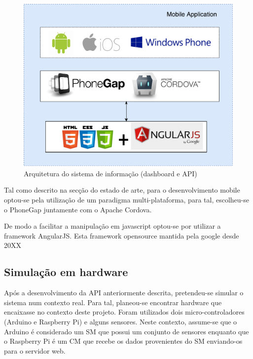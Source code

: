 \begin{figure}[h]
	\centering
	\includegraphics[scale = 0.5]{esquemas/arquitetura-mobile.pdf}
	\caption{Arquitetura do sistema de informação (dashboard e API)}
	\label{arquiteturasi}
\end{figure}



Tal como descrito na secção do estado de arte, para o desenvolvimento mobile optou-se pela utilização de um paradigma multi-plataforma, para tal, escolheu-se o PhoneGap juntamente com o Apache Cordova. 




De modo a facilitar a manipulação em javascript optou-se por utilizar a framework AngularJS. Esta framework opensource mantida pela google desde 20XX 



\newpage
\subsection{Simulação em hardware}


Após a desenvolvimento da API anteriormente descrita, pretendeu-se simular o sistema num contexto real. Para tal, planeou-se encontrar hardware que encaixasse no contexto deste projeto. Foram utilizados dois micro-controladores (Arduino e Raspberry Pi) e alguns sensores. Neste contexto, assume-se que o Arduino é considerado um \ac{SM} que possui um conjunto de sensores enquanto que o Raspberry Pi é um \ac{CM} que recebe os dados provenientes do \ac{SM} enviando-os para o servidor web.  

